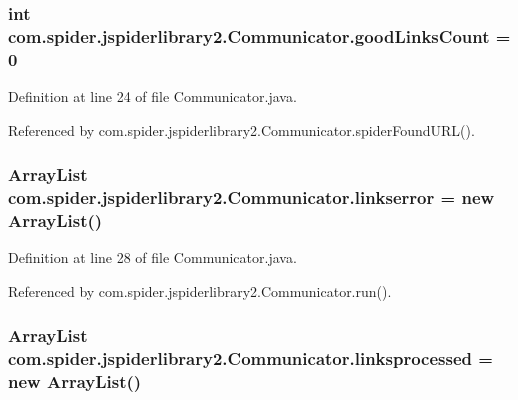 \hypertarget{classcom_1_1spider_1_1jspiderlibrary2_1_1_communicator_a4d9dc7e33426c4efc3694340240bb568}{
\subsubsection[{good\-Links\-Count}]{\setlength{\rightskip}{0pt plus 5cm}int {\bf com.\-spider.\-jspiderlibrary2.\-Communicator.\-good\-Links\-Count} = 0}}\label{classcom_1_1spider_1_1jspiderlibrary2_1_1_communicator_a4d9dc7e33426c4efc3694340240bb568}


\-Definition at line 24 of file \-Communicator.\-java.



\-Referenced by com.\-spider.\-jspiderlibrary2.\-Communicator.\-spider\-Found\-U\-R\-L().

\hypertarget{classcom_1_1spider_1_1jspiderlibrary2_1_1_communicator_ad9dc6cc7afc6f0203c1b5c723cd3cb06}{
\subsubsection[{linkserror}]{\setlength{\rightskip}{0pt plus 5cm}\-Array\-List {\bf com.\-spider.\-jspiderlibrary2.\-Communicator.\-linkserror} = new \-Array\-List()}}\label{classcom_1_1spider_1_1jspiderlibrary2_1_1_communicator_ad9dc6cc7afc6f0203c1b5c723cd3cb06}


\-Definition at line 28 of file \-Communicator.\-java.



\-Referenced by com.\-spider.\-jspiderlibrary2.\-Communicator.\-run().

\hypertarget{classcom_1_1spider_1_1jspiderlibrary2_1_1_communicator_ae6f31dbdb619cb67252f0c549ea8d81d}{
\subsubsection[{linksprocessed}]{\setlength{\rightskip}{0pt plus 5cm}\-Array\-List {\bf com.\-spider.\-jspiderlibrary2.\-Communicator.\-linksprocessed} = new \-Array\-List()}}\label{classcom_1_1spider_1_1jspiderlibrary2_1_1_communicator_ae6f31dbdb619cb67252f0c549ea8d81d}


